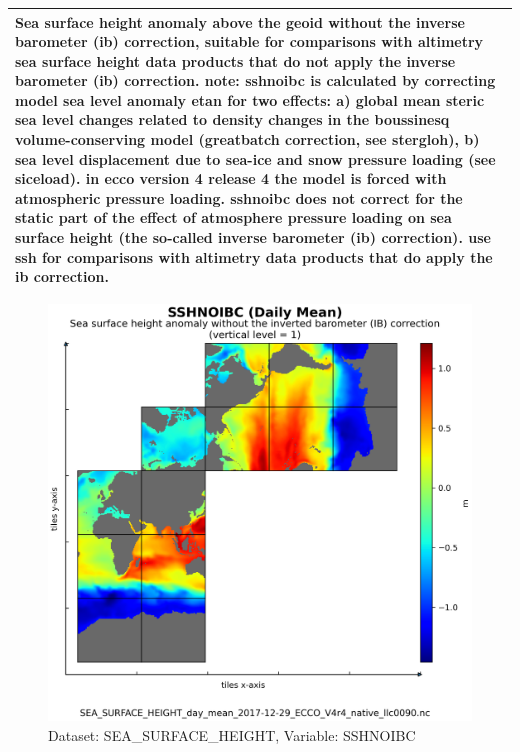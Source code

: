 \begin{longtable}{|m{}|m{}|m{}|m{}|}
\multicolumn{4}{|p{1\textwidth}|}{\footnotesize{{Sea surface height anomaly above the geoid without the inverse barometer (ib) correction, suitable for comparisons with altimetry sea surface height data products that do not apply the inverse barometer (ib) correction. note: sshnoibc is calculated by correcting model sea level anomaly etan for two effects: a) global mean steric sea level changes related to density changes in the boussinesq volume-conserving model (greatbatch correction, see stergloh), b) sea level displacement due to sea-ice and snow pressure loading (see siceload). in ecco version 4 release 4 the model is forced with atmospheric pressure loading. sshnoibc does not correct for the static part of the effect of atmosphere pressure loading on sea surface height (the so-called inverse barometer (ib) correction). use ssh for comparisons with altimetry data products that do apply the ib correction.}}} \\ \hline
\end{longtable}

\begin{figure}[H]
\centering
\includegraphics[scale=0.55]{../images/plots/native_plots/Sea_Surface_Height/SSHNOIBC.png}
\caption{Dataset: SEA\_SURFACE\_HEIGHT, Variable: SSHNOIBC}
\label{tab:table-SEA_SURFACE_HEIGHT_SSHNOIBC-Plot}
\end{figure}
\newpage